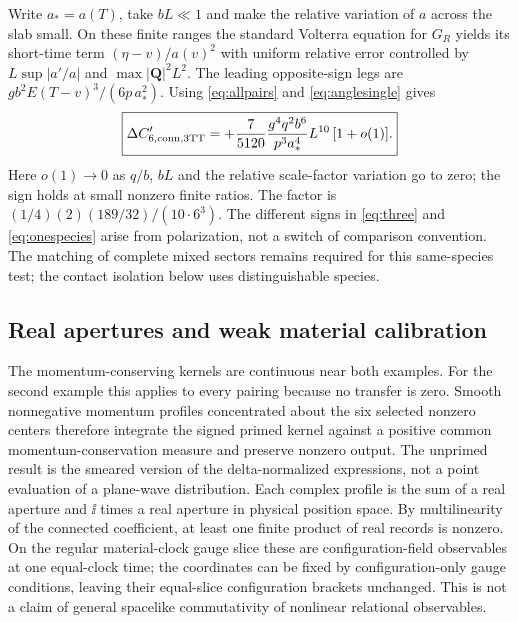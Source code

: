 Write \(a_*=a(T)\), take \(bL\ll1\) and make the relative variation of \(a\) across the slab small. On these finite ranges the standard Volterra equation for \(G_R\) yields its short-time term \((\eta-v)/a(v)^2\) with uniform relative error controlled by \(L\sup|a'/a|\) and \(\max|\boldsymbol Q|^2L^2\). The leading opposite-sign legs are \(g b^2 E(T-v)^3/(6p\,a_*^2)\). Using \eqref{eq:allpairs} and \eqref{eq:anglesingle} gives
\begin{equation}
 \boxed{\displaystyle
 \Delta C_{6,\mathrm{conn},3\mathrm{TT}}'=
 +\frac{7}{5120}\frac{g^4q^2b^6}{p^3a_*^4}L^{10}\,[1+o(1)].}
 \label{eq:onespecies}
\end{equation}
Here \(o(1)\to0\) as \(q/b\), \(bL\) and the relative scale-factor variation go to zero; the sign holds at small nonzero finite ratios. The factor is \((1/4)(2)(189/32)/(10\cdot6^3)\). The different signs in \eqref{eq:three} and \eqref{eq:onespecies} arise from polarization, not a switch of comparison convention. The matching of complete mixed sectors remains required for this same-species test; the contact isolation below uses distinguishable species.

\subsection{Real apertures and weak material calibration}\label{sec:packets}
The momentum-conserving kernels are continuous near both examples. For the second example this applies to every pairing because no transfer is zero. Smooth nonnegative momentum profiles concentrated about the six selected nonzero centers therefore integrate the signed primed kernel against a positive common momentum-conservation measure and preserve nonzero output. The unprimed result is the smeared version of the delta-normalized expressions, not a point evaluation of a plane-wave distribution. Each complex profile is the sum of a real aperture and \(\ii\) times a real aperture in physical position space. By multilinearity of the connected coefficient, at least one finite product of real records is nonzero. On the regular material-clock gauge slice these are configuration-field observables at one equal-clock time; the coordinates can be fixed by configuration-only gauge conditions, leaving their equal-slice configuration brackets unchanged. This is not a claim of general spacelike commutativity of nonlinear relational observables.

